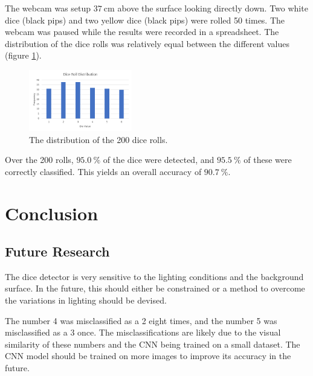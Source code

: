 \documentclass[conference]{IEEEtran}
\begin{document}
The webcam was setup $\SI{37}{\centi\metre}$ above the surface looking directly down. 
Two white dice (black pips) and two yellow dice (black pips) were rolled 50 times.
The webcam was paused while the results were recorded in a spreadsheet.
The distribution of the dice rolls was relatively equal between the different values (figure \ref{fig:results}).
\begin{figure}
	\centering
	\includegraphics[width=0.4\textwidth]{results}
	\caption{The distribution of the 200 dice rolls.}
	\label{fig:results}
\end{figure}

Over the 200 rolls, $\SI{95.0}{\percent}$ of the dice were detected, and $\SI{95.5}{\percent}$ of these were correctly classified.
This yields an overall accuracy of $\SI{90.7}{\percent}$.

\section{Conclusion}

\subsection{Future Research}

The dice detector is very sensitive to the lighting conditions and the background surface.
In the future, this should either be constrained or a method to overcome the variations in lighting should be devised.

The number 4 was misclassified as a 2 eight times, and the number 5 was misclassified as a 3 once.
The misclassifications are likely due to the visual similarity of these numbers and the CNN being trained on a small dataset. 
The CNN model should be trained on more images to improve its accuracy in the future.

\printbibliography
\end{document}
